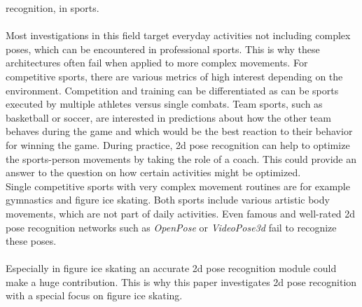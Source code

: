 recognition, in sports.
\\\mbox{}\\
Most investigations in this field target everyday activities not including complex poses, which can be encountered in
professional sports.
This is why these architectures often fail when applied to more complex movements.
For competitive sports, there are various metrics of high interest depending on the environment.
Competition and training can be differentiated as can be sports executed by multiple athletes versus single combats.
Team sports, such as basketball or soccer, are interested in predictions about
how the other team behaves during the game and which would be the best reaction to their behavior for winning
the game.
During practice, 2d pose recognition can help to optimize the sports-person movements by taking the role of a coach.
This could provide an answer to the question on how certain activities might be optimized. \\
Single competitive sports with very complex movement routines are for example gymnastics and figure ice skating.
Both sports include various artistic body movements, which are not part of daily activities.
Even famous and well-rated 2d pose recognition networks such as \textit{OpenPose} or \textit{VideoPose3d} fail to recognize these
poses.
\\\mbox{}\\
Especially in figure ice skating an accurate 2d pose recognition module could make a huge contribution.
This is why this paper investigates 2d pose recognition with a special focus on figure ice skating.
%




